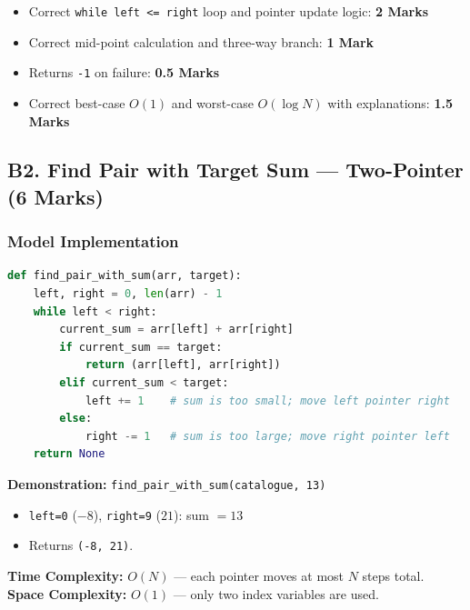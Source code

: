 \documentclass[11pt,a4paper]{article}
\newenvironment{markbox}[1]{%
    \begin{tcolorbox}[colback=markgreen!6!white, colframe=markgreen, title=\textbf{Mark Allocation --- #1}]
}{%
    \end{tcolorbox}
}
\begin{document}
\begin{markbox}{B1 --- 5 Marks}
\begin{itemize}
    \item Correct \texttt{while left <= right} loop and pointer update logic: \textbf{2 Marks}
    \item Correct mid-point calculation and three-way branch: \textbf{1 Mark}
    \item Returns \texttt{-1} on failure: \textbf{0.5 Marks}
    \item Correct best-case $O(1)$ and worst-case $O(\log N)$ with explanations: \textbf{1.5 Marks}
\end{itemize}
\end{markbox}

\subsection*{B2. Find Pair with Target Sum --- Two-Pointer (6 Marks)}

\subsubsection*{Model Implementation}
\begin{lstlisting}[language=Python]
def find_pair_with_sum(arr, target):
    left, right = 0, len(arr) - 1
    while left < right:
        current_sum = arr[left] + arr[right]
        if current_sum == target:
            return (arr[left], arr[right])
        elif current_sum < target:
            left += 1    # sum is too small; move left pointer right
        else:
            right -= 1   # sum is too large; move right pointer left
    return None
\end{lstlisting}

\textbf{Demonstration:} \texttt{find\_pair\_with\_sum(catalogue, 13)}
\begin{itemize}
    \item \texttt{left=0} ($-8$), \texttt{right=9} ($21$): sum $= 13$ \checkmark
    \item Returns \texttt{(-8, 21)}.
\end{itemize}

\textbf{Time Complexity:} $O(N)$ --- each pointer moves at most $N$ steps total. \\
\textbf{Space Complexity:} $O(1)$ --- only two index variables are used.
\end{document}
